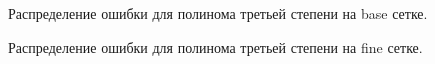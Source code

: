 \begin{figure}[H]
    \centering
    \caption{Распределение ошибки для полинома третьей степени на base сетке.}
    \label{fig:20}
\end{figure}

\begin{figure}[H]
    \centering
    \caption{Распределение ошибки для полинома третьей степени на fine сетке.}
    \label{fig:21}
\end{figure}


